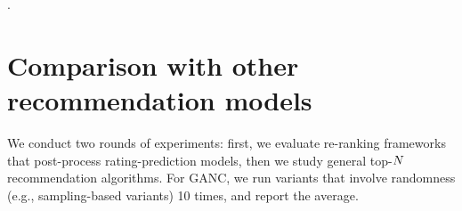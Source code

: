 \begin{figure*}[p]
\centering 
        
        
        
        
\caption{Performance of GANC(ARec, $\bm{\theta}$, Dyn), with fixed sample size $S =|500|$,  different accuracy recommenders (ARec), and different long-tail preference models ($\bm{\theta}$). Dataset is ML-1M. The trends are approximately the same as we vary  the accuracy recommender  in Figures~\ref{fig:thetavsthetaStar}.a,~\ref{fig:thetavsthetaStar}.b,~\ref{fig:thetavsthetaStar}.c, and~\ref{fig:thetavsthetaStar}.d. In each row, ARec typically achieves the highest F-measure, but performs poorly w.r.t. coverage and gini.  Variants of our framework that use $\bm{\theta}^{G}$, $\bm{\theta}^{T}$, $\bm{\theta}^{N}$, obtain higher f-measure levels compared to those that use    $\bm{\theta}^{R}$ and $\bm{\theta}^{C}$. They also improve stratified recall, independent of the accuracy recommender. Stratified Recall emphasizes novelty and accuracy}.%
\label{fig:thetavsthetaStar}
\end{figure*}

\iffalse 

\fi

\section{Comparison with other recommendation models}
We conduct two rounds of experiments: first, we evaluate re-ranking frameworks that post-process rating-prediction models, then we  study general top-$N$ recommendation algorithms. For GANC, we run variants that involve randomness (e.g., sampling-based variants)  10 times, and report the average.

